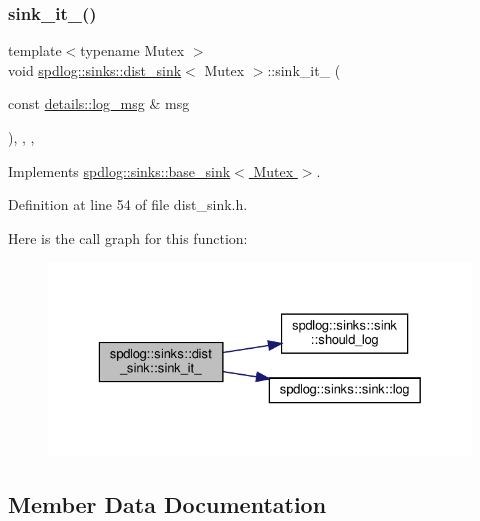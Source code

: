 \subsubsection{\texorpdfstring{sink\+\_\+it\+\_\+()}{sink\_it\_()}}
{\footnotesize\ttfamily template$<$typename Mutex $>$ \\
void \hyperlink{classspdlog_1_1sinks_1_1dist__sink}{spdlog\+::sinks\+::dist\+\_\+sink}$<$ Mutex $>$\+::sink\+\_\+it\+\_\+ (\begin{DoxyParamCaption}\item[{const \hyperlink{structspdlog_1_1details_1_1log__msg}{details\+::log\+\_\+msg} \&}]{msg }\end{DoxyParamCaption})\hspace{0.3cm}{\ttfamily [inline]}, {\ttfamily [override]}, {\ttfamily [protected]}, {\ttfamily [virtual]}}



Implements \hyperlink{classspdlog_1_1sinks_1_1base__sink_ad698d300cb7f5e58b2aa1b9907cdbd87}{spdlog\+::sinks\+::base\+\_\+sink$<$ Mutex $>$}.



Definition at line 54 of file dist\+\_\+sink.\+h.

Here is the call graph for this function\+:
\nopagebreak
\begin{figure}[H]
\begin{center}
\leavevmode
\includegraphics[width=329pt]{classspdlog_1_1sinks_1_1dist__sink_a516ef929a8cd73df2ead2e0086e04607_cgraph}
\end{center}
\end{figure}


\subsection{Member Data Documentation}
\mbox{\label{classspdlog_1_1sinks_1_1dist__sink_a3d9d8c330d7d6455f45db77d4e6977f4}} 
